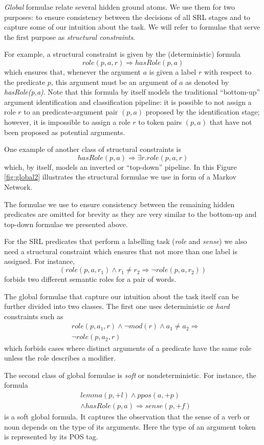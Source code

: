 
\emph{Global} formulae relate several hidden ground atoms. We use them for two 
purposes: to ensure consistency between the decisions of all SRL stages and to 
capture some of our intuition about the task. We will refer to formulae that 
serve the first purpose as \emph{structural constraints}. 

For example, a structural constraint is given by the (deterministic) formula
\[role(p,a,r) \Rightarrow hasRole(p,a)\]
which ensures that, whenever the argument $a$ is given a label $r$ with respect 
to the predicate $p$, this argument must be an argument of $a$ as denoted by 
\emph{hasRole(p,a)}. Note that this formula by itself models the traditional 
``bottom-up'' argument identification and classification pipeline: it is 
possible to not assign a role $r$ to an predicate-argument pair $(p,a)$ proposed 
by the identification stage; however, it is impossible to assign a role $r$ to 
token pairs $(p,a)$ that have not been proposed as potential arguments.

One example of another class of structural constraints is 
\[
hasRole(p,a)\Rightarrow\exists r.role(p,a,r)
\]
which, by itself, models an inverted or ``top-down'' pipeline. In this Figure 
\ref{fig:global2} illustrates the structural formulae we use in form of a Markov 
Network.

The formulae we use to ensure consistency between the remaining hidden 
predicates are omitted for brevity as they are very similar to the bottom-up and 
top-down formulae we presented above.

For the SRL predicates that perform a labelling task (\emph{role} and 
\emph{sense}) we also need a structural constraint which ensures that not more 
than one label is assigned. For instance,
\[
(role(p,a,r_1) \wedge r_1 \neq r_2 \Rightarrow \neg role(p,a,r_2)  )
\]
forbids two different semantic roles for a pair of words. 

The global formulae that capture our intuition about the task itself can be 
further divided into two classes. The first one uses deterministic or 
\emph{hard} constraints such as
\begin{eqnarray*}
 &role\left(p,a_{1},r\right)\wedge \neg mod\left(r\right)\wedge a_{1}\neq a_{2}  \Rightarrow\\
  & \neg role\left(p,a_{2},r\right)
\end{eqnarray*}
which forbids cases where distinct arguments of a predicate have the same role 
unless the role describes a modifier.

The second class of global formulae is \emph{soft} or nondeterministic. For 
instance, the formula
\begin{eqnarray*}
  & lemma(p,+l) \wedge ppos(a,+p)  \\
  & \wedge hasRole(p,a)  \Rightarrow sense(p,+f) 
\end{eqnarray*}
is a soft global formula. It captures the observation that the sense of a verb 
or noun depends on the type of its arguments. Here the type of an argument token 
is represented by its POS tag.

